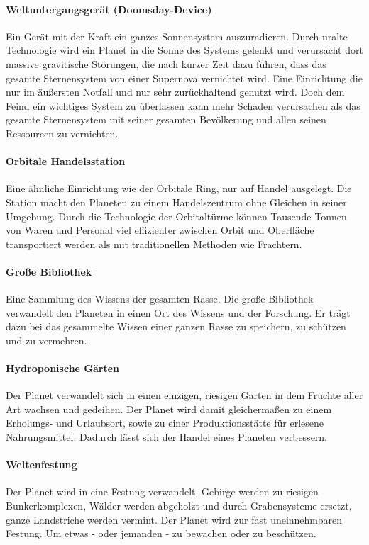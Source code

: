 \documentclass[11pt, a4paper]{article}
\begin{document}
\paragraph{Weltuntergangsgerät (Doomsday-Device)}
Ein Gerät mit der Kraft ein ganzes Sonnensystem auszuradieren. Durch uralte Technologie wird ein Planet in die
Sonne des Systems gelenkt und verursacht dort massive gravitische Störungen, die nach kurzer Zeit dazu führen,
dass das gesamte Sternensystem von einer Supernova vernichtet wird. Eine Einrichtung die nur im äußersten Notfall
und nur sehr zurückhaltend genutzt wird. Doch dem Feind ein wichtiges System zu überlassen kann mehr Schaden
verursachen als das gesamte Sternensystem mit seiner gesamten Bevölkerung und allen seinen Ressourcen zu 
vernichten.
%
\paragraph{Orbitale Handelsstation}
Eine ähnliche Einrichtung wie der Orbitale Ring, nur auf Handel ausgelegt. Die Station macht den Planeten
zu einem Handelszentrum ohne Gleichen in seiner Umgebung. Durch die Technologie der Orbitaltürme können 
Tausende Tonnen von Waren und Personal viel effizienter zwischen Orbit und Oberfläche transportiert werden
als mit traditionellen Methoden wie Frachtern.
%
\paragraph{Große Bibliothek}
Eine Sammlung des Wissens der gesamten Rasse. Die große Bibliothek verwandelt den Planeten in einen Ort des 
Wissens und der Forschung. Er trägt dazu bei das gesammelte Wissen einer ganzen Rasse zu speichern, zu schützen 
und zu vermehren.
%
\paragraph{Hydroponische Gärten}
Der Planet verwandelt sich in einen einzigen, riesigen Garten in dem Früchte aller Art wachsen und gedeihen.
Der Planet wird damit gleichermaßen zu einem Erholungs- und Urlaubsort, sowie zu einer Produktionsstätte für 
erlesene Nahrungsmittel. Dadurch lässt sich der Handel eines Planeten verbessern.
%
\paragraph{Weltenfestung}
Der Planet wird in eine Festung verwandelt. Gebirge werden zu riesigen Bunkerkomplexen, Wälder werden abgeholzt 
und durch Grabensysteme ersetzt, ganze Landstriche werden vermint. Der Planet wird zur fast uneinnehmbaren 
Festung. Um etwas - oder jemanden - zu bewachen oder zu beschützen.
%
\end{document}
